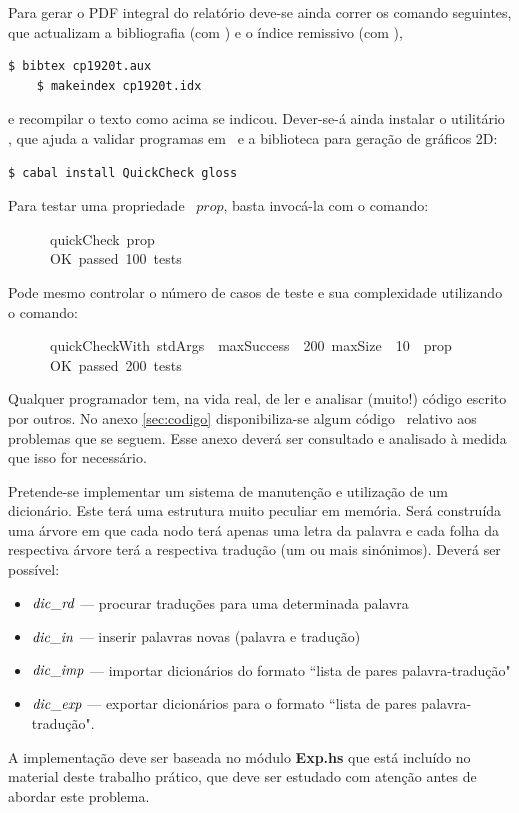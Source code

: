 \documentclass[a4paper]{article}
\newcommand{\Varid}[1]{\mathit{#1}}
\begin{document}
Para gerar o PDF integral do relatório deve-se ainda correr os comando seguintes,
que actualizam a bibliografia (com \Bibtex) e o índice remissivo (com \Makeindex),
\begin{Verbatim}[fontsize=\small]
    $ bibtex cp1920t.aux
    $ makeindex cp1920t.idx
\end{Verbatim}
e recompilar o texto como acima se indicou. Dever-se-á ainda instalar o utilitário
\QuickCheck,
que ajuda a validar programas em \Haskell\ e a biblioteca  para
geração de gráficos 2D:
\begin{Verbatim}[fontsize=\small]
    $ cabal install QuickCheck gloss
\end{Verbatim}
Para testar uma propriedade \QuickCheck~\ensuremath{\Varid{prop}}, basta invocá-la com o comando:
\begin{tabbing}\ttfamily
~~~~~~quickCheck~prop\\
\ttfamily ~~~~~~OK~passed~100~tests
\end{tabbing}
Pode mesmo controlar o número de casos de teste e sua complexidade utilizando
o comando:
\begin{tabbing}\ttfamily
~~~~~~quickCheckWith~stdArgs~~maxSuccess~~200~maxSize~~10~~prop\\
\ttfamily ~~~~~~OK~passed~200~tests
\end{tabbing}
Qualquer programador tem, na vida real, de ler e analisar (muito!) código
escrito por outros. No anexo \ref{sec:codigo} disponibiliza-se algum
código \Haskell\ relativo aos problemas que se seguem. Esse anexo deverá
ser consultado e analisado à medida que isso for necessário.

\Problema

Pretende-se implementar um sistema de manutenção e utilização de um dicionário.
Este terá uma estrutura muito peculiar em memória. Será construída
uma árvore em que cada nodo terá apenas uma letra da palavra e cada
folha da respectiva árvore terá a respectiva tradução (um ou mais sinónimos).
Deverá ser possível:
\begin{itemize}
\item
\ensuremath{\Varid{dic\char95 rd}} --- procurar traduções para uma determinada palavra
\item	
\ensuremath{\Varid{dic\char95 in}} --- inserir palavras novas (palavra e tradução)
\item
\ensuremath{\Varid{dic\char95 imp}} --- importar dicionários do formato ``lista de pares palavra-tradução"
\item
\ensuremath{\Varid{dic\char95 exp}} --- exportar dicionários para o formato ``lista de pares palavra-tradução".
\end{itemize}
A implementação deve ser baseada no módulo \textbf{Exp.hs} que está incluído no material deste trabalho prático,
que deve ser estudado com atenção antes de abordar este problema.
\end{document}
